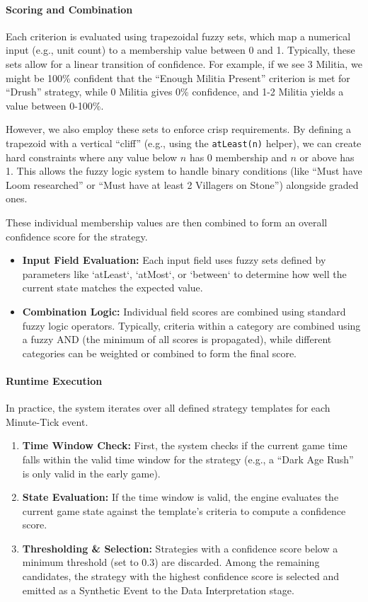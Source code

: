 \paragraph{Scoring and Combination}
Each criterion is evaluated using trapezoidal fuzzy sets, which map a numerical input (e.g., unit count) to a membership value between 0 and 1. Typically, these sets allow for a linear transition of confidence. For example, if we see 3 Militia, we might be 100\% confident that the ``Enough Militia Present'' criterion is met for ``Drush'' strategy, while 0 Militia gives 0\% confidence, and 1-2 Militia yields a value between 0-100\%.

However, we also employ these sets to enforce crisp requirements. By defining a trapezoid with a vertical ``cliff'' (e.g., using the \texttt{atLeast(n)} helper), we can create hard constraints where any value below $n$ has 0 membership and $n$ or above has 1. This allows the fuzzy logic system to handle binary conditions (like ``Must have Loom researched'' or ``Must have at least 2 Villagers on Stone'') alongside graded ones.

These individual membership values are then combined to form an overall confidence score for the strategy.

\begin{itemize}
  \item \textbf{Input Field Evaluation:} Each input field uses fuzzy sets defined by parameters like `atLeast`, `atMost`, or `between` to determine how well the current state matches the expected value.
  \item \textbf{Combination Logic:} Individual field scores are combined using standard fuzzy logic operators. Typically, criteria within a category are combined using a fuzzy AND (the minimum of all scores is propagated), while different categories can be weighted or combined to form the final score.
\end{itemize}

\paragraph{Runtime Execution}
In practice, the system iterates over all defined strategy templates for each Minute-Tick event.
\begin{enumerate}
  \item \textbf{Time Window Check:} First, the system checks if the current game time falls within the valid time window for the strategy (e.g., a ``Dark Age Rush'' is only valid in the early game).
  \item \textbf{State Evaluation:} If the time window is valid, the engine evaluates the current game state against the template's criteria to compute a confidence score.
  \item \textbf{Thresholding \& Selection:} Strategies with a confidence score below a minimum threshold (set to 0.3) are discarded. Among the remaining candidates, the strategy with the highest confidence score is selected and emitted as a Synthetic Event to the Data Interpretation stage.
\end{enumerate}

